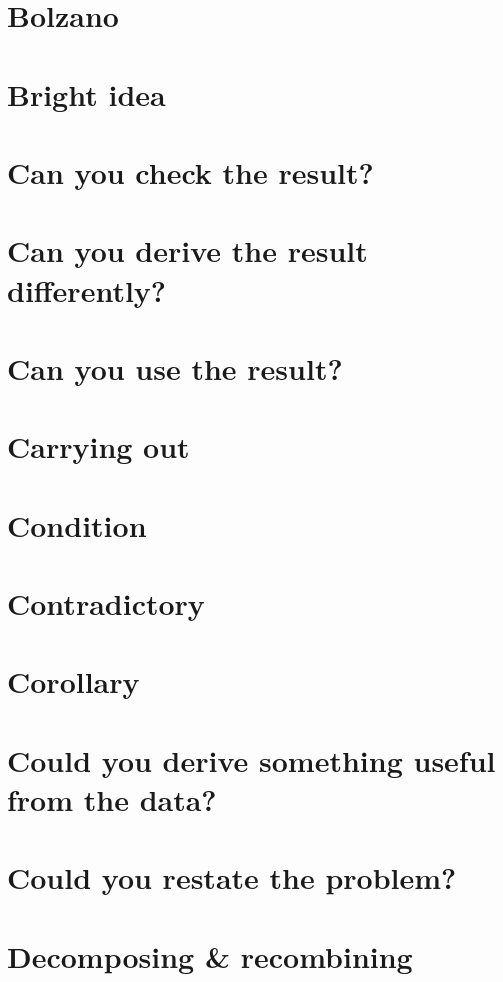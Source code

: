 \documentclass[oneside]{book}
\numberwithin{equation}{section}
\begin{document}
\section{Bolzano}

\section{Bright idea}

\section{Can you check the result?}

\section{Can you derive the result differently?}

\section{Can you use the result?}

\section{Carrying out}

\section{Condition}

\section{Contradictory}

\section{Corollary}

\section{Could you derive something useful from the data?}

\section{Could you restate the problem?}

\section{Decomposing \& recombining}
\end{document}
